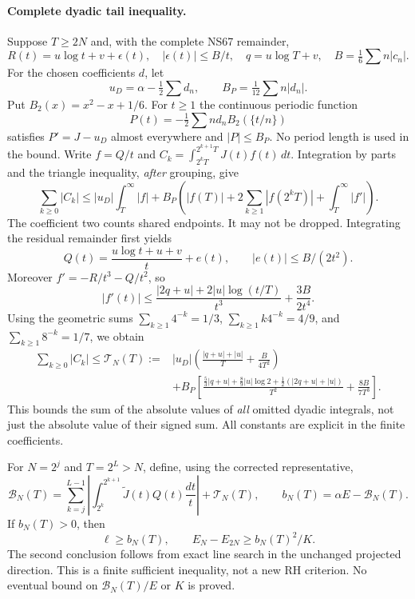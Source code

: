 \paragraph{Complete dyadic tail inequality.}
Suppose $T\ge2N$ and, with the complete NS67 remainder,
\[
 R(t)=u\log t+v+\epsilon(t),\quad |\epsilon(t)|\le B/t,
 \quad q=u\log T+v,\quad B=\tfrac16\sum n|c_n|.
\]
For the chosen coefficients $d$, let
\[
 u_D=\alpha-\tfrac12\sum d_n,\qquad B_P=\tfrac1{12}\sum n|d_n|.
\]
Put $B_2(x)=x^2-x+1/6$. For $t\ge1$ the continuous periodic function
\[
 P(t)=-\tfrac12\sum n d_n B_2(\{t/n\})
\]
satisfies $P'=J-u_D$ almost everywhere and $|P|\le B_P$.
No period length is used in the bound. Write $f=Q/t$ and
$C_k=\int_{2^kT}^{2^{k+1}T}J(t)f(t)\,dt$. Integration by parts and the
triangle inequality, \emph{after} grouping, give
\[
 \sum_{k\ge0}|C_k|\le |u_D|\int_T^\infty|f|
 +B_P\left(|f(T)|+2\sum_{k\ge1}|f(2^kT)|+\int_T^\infty|f'|\right).
\]
The coefficient two counts shared endpoints. It may not be dropped.
Integrating the residual remainder first yields
\[
 Q(t)=\frac{u\log t+u+v}{t}+e(t),\qquad |e(t)|\le B/(2t^2).
\]
Moreover $f'=-R/t^3-Q/t^2$, so
\[
 |f'(t)|\le\frac{|2q+u|+2|u|\log(t/T)}{t^3}+\frac{3B}{2t^4}.
\]
Using the geometric sums $\sum_{k\ge1}4^{-k}=1/3$,
$\sum_{k\ge1}k4^{-k}=4/9$, and $\sum_{k\ge1}8^{-k}=1/7$, we obtain
\begin{align}
 \sum_{k\ge0}|C_k|\le\mathcal T_N(T):={}&
 |u_D|\left(\frac{|q+u|+|u|}{T}+\frac{B}{4T^2}\right)\\
 &+B_P\left[
 \frac{\tfrac53|q+u|+\tfrac89|u|\log2+
                    \tfrac12(|2q+u|+|u|)}{T^2}
 +\frac{8B}{7T^3}\right].
 \label{ns91-tail}
\end{align}
This bounds the sum of the absolute values of \emph{all} omitted dyadic
integrals, not just the absolute value of their signed sum. All constants
are explicit in the finite coefficients.

For $N=2^j$ and $T=2^L>N$, define, using the corrected representative,
\[
 \mathcal B_N(T)=
 \sum_{k=j}^{L-1}\left|\int_{2^k}^{2^{k+1}}
                  \widetilde J(t)Q(t)\frac{dt}{t}\right|
 +\mathcal T_N(T),\qquad b_N(T)=\alpha E-\mathcal B_N(T).
\]
If $b_N(T)>0$, then
\[
 \ell\ge b_N(T),\qquad E_N-E_{2N}\ge b_N(T)^2/K.
\]
The second conclusion follows from exact line search in the unchanged
projected direction. This is a finite sufficient inequality, not a new
RH criterion. No eventual bound on $\mathcal B_N(T)/E$ or $K$ is proved.

